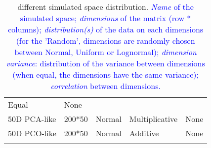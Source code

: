 \documentclass[]{article}
\begin{document}
\begin{longtable}[]{@{}lllll@{}}
\begin{minipage}[t]{0.21\columnwidth}
Equal\strut
\end{minipage} & \begin{minipage}[t]{0.13\columnwidth}\raggedright\strut
None\strut
\end{minipage}\tabularnewline
\begin{minipage}[t]{0.12\columnwidth}\raggedright\strut
50D PCA-like\strut
\end{minipage} & \begin{minipage}[t]{0.12333\columnwidth}\raggedright\strut
200*50\strut
\end{minipage} & \begin{minipage}[t]{0.31\columnwidth}\raggedright\strut
Normal\strut
\end{minipage} & \begin{minipage}[t]{0.21\columnwidth}\raggedright\strut
Multiplicative\strut
\end{minipage} & \begin{minipage}[t]{0.13\columnwidth}\raggedright\strut
None\strut
\end{minipage}\tabularnewline
\begin{minipage}[t]{0.12\columnwidth}\raggedright\strut
50D PCO-like\strut
\end{minipage} & \begin{minipage}[t]{0.12333\columnwidth}\raggedright\strut
200*50\strut
\end{minipage} & \begin{minipage}[t]{0.31\columnwidth}\raggedright\strut
Normal\strut
\end{minipage} & \begin{minipage}[t]{0.21\columnwidth}\raggedright\strut
Additive\strut
\end{minipage} & \begin{minipage}[t]{0.13\columnwidth}\raggedright\strut
None\strut
\end{minipage}\tabularnewline
\bottomrule
\caption{different simulated space distribution.
\textcolor{blue}{ \textit{Name} of the simulated space; \textit{dimensions} of the matrix (row * columns); \textit{distribution(s)} of the data on each dimensions (for the 'Random', dimensions are randomly chosen between Normal, Uniform or Lognormal); \textit{dimension variance}: distribution of the variance between dimensions (when equal, the dimensions have the same variance); \textit{correlation} between dimensions.}}
\end{longtable}

\renewcommand\baselinestretch{1.6}\selectfont
\end{document}
